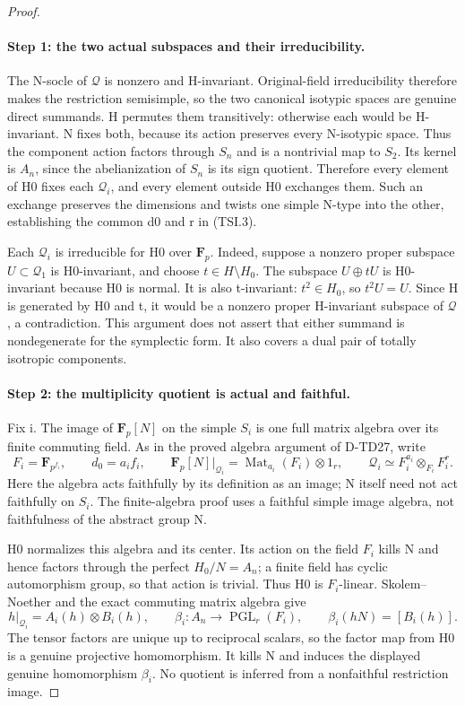 \begin{proof}
\paragraph{Step 1: the two actual subspaces and their irreducibility.}
The N-socle of \(\mathcal Q\) is nonzero and H-invariant.
Original-field irreducibility therefore makes the restriction
semisimple, so the two canonical isotypic spaces are genuine
direct summands.  H permutes them transitively: otherwise each
would be H-invariant.  N fixes both, because its action preserves
every N-isotypic space.  Thus the component action factors through
\(S_n\) and is a nontrivial map to \(S_2\).
Its kernel is \(A_n\), since the abelianization of \(S_n\)
is its sign quotient.  Therefore every element of H0 fixes
each \(\mathcal Q_i\), and every element outside H0 exchanges
them.  Such an exchange preserves the dimensions and twists one
simple N-type into the other, establishing the common d0 and r
in (TSI.3).

Each \(\mathcal Q_i\) is irreducible for H0 over
\(\mathbf F_p\).  Indeed, suppose a nonzero proper subspace
\(U\subset\mathcal Q_1\) is H0-invariant, and choose
\(t\in H\setminus H_0\).  The subspace \(U\oplus tU\)
is H0-invariant because H0 is normal.  It is also t-invariant:
\(t^2\in H_0\), so \(t^2U=U\).  Since H is generated by
H0 and t, it would be a nonzero proper H-invariant subspace
of \(\mathcal Q\), a contradiction.
This argument does not assert that either summand is
nondegenerate for the symplectic form.  It also covers a dual
pair of totally isotropic components.

\paragraph{Step 2: the multiplicity quotient is actual and faithful.}
Fix i.  The image of \(\mathbf F_p[N]\) on the simple
\(S_i\) is one full matrix algebra over its finite commuting
field.  As in the proved algebra argument of D-TD27, write
\[
 F_i=\mathbf F_{p^{f_i}},\qquad d_0=a_i f_i,\qquad
 \mathbf F_p[N]\big|_{\mathcal Q_i}
      =\operatorname{Mat}_{a_i}(F_i)\otimes1_r,
 \qquad \mathcal Q_i\simeq F_i^{a_i}\otimes_{F_i}F_i^r.
 \tag{TSI.6}
\]
Here the algebra acts faithfully by its definition as an image;
N itself need not act faithfully on \(S_i\).
The finite-algebra proof uses a faithful simple image algebra,
not faithfulness of the abstract group N.

H0 normalizes this algebra and its center.  Its action on the
field \(F_i\) kills N and hence factors through the perfect
\(H_0/N=A_n\); a finite field has cyclic automorphism group,
so that action is trivial.  Thus H0 is \(F_i\)-linear.
Skolem--Noether and the exact commuting matrix algebra give
\[
 h\big|_{\mathcal Q_i}=A_i(h)\otimes B_i(h),\qquad
 \beta_i:A_n\longrightarrow\operatorname{PGL}_r(F_i),
       \qquad \beta_i(hN)=[B_i(h)].
 \tag{TSI.7}
\]
The tensor factors are unique up to reciprocal scalars, so the
factor map from H0 is a genuine projective homomorphism.  It
kills N and induces the displayed genuine homomorphism \(\beta_i\).
No quotient is inferred from a nonfaithful restriction image.


\end{proof}
